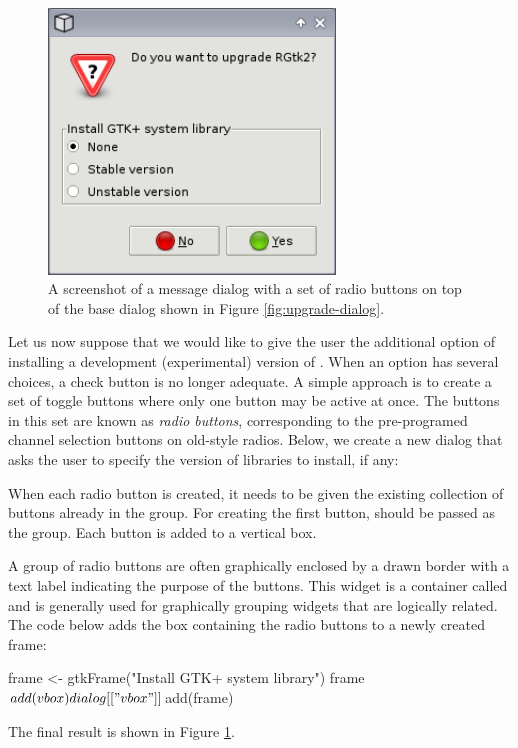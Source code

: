 \documentclass[article,shortnames]{jss}
\begin{document}
\begin{figure}[tbp]
  \begin{center}
    \includegraphics[width=3in]{radio-dialog.png}
    \caption{\label{fig:radio-dialog}A screenshot of a message dialog
with
      a set of
      radio buttons on top of the base dialog shown in Figure
      \ref{fig:upgrade-dialog}.}
  \end{center}
\end{figure}

Let us now suppose that we would like to give the user the additional
option of installing a development (experimental) version of
.  When an option has several choices, a check button is no
longer adequate. A simple approach is to create a set of toggle
buttons where only one button may be active at once. The buttons in
this set are known as \emph{radio buttons}, corresponding to the
pre-programed channel selection buttons on old-style radios.  Below,
we create a new dialog that asks the user to specify the version of
  libraries to install, if any: 
When each radio button is created, it
needs to be given the existing collection of buttons already in the
group. For creating the first button,  should be passed as
the group.  Each button is added to a vertical box.

A group of radio buttons are often graphically enclosed by a drawn
border with a text label indicating the purpose of the buttons. This
widget is a container called  and is generally used for
graphically grouping widgets that are logically related. The code
below adds the box containing the radio buttons to a newly created
frame:
\begin{Code}
frame <- gtkFrame("Install GTK+ system library")
frame$add(vbox)
dialog[["vbox"]]$add(frame)
\end{Code}
The final result is shown in Figure \ref{fig:radio-dialog}.
\end{document}
